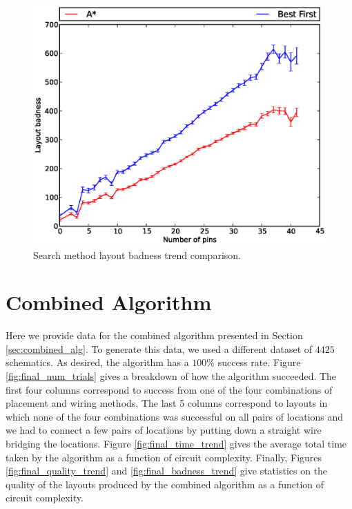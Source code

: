 \begin{figure}[H]
\begin{center}
\includegraphics[width=\textwidth]{Images/search_badness_trend_comparison.eps}
\caption[Search method layout badness trend comparison]{Search method layout
badness trend comparison.}
\label{fig:search_badness_trend}
\end{center}
\end{figure}

\section{Combined Algorithm}
\label{sec:combined_algorithm}

Here we provide data for the combined algorithm presented in Section
\ref{sec:combined_alg}. To generate this data, we used a different dataset of
$4425$ schematics. As desired, the algorithm has a $100\%$ success rate.
Figure \ref{fig:final_num_trials} gives a breakdown of how the algorithm
succeeded. The first four columns correspond to success from one of the four
combinations of placement and wiring methods. The last 5 columns correspond to
layouts in which none of the four combinations was successful on all pairs of
locations and we had to connect a few pairs of locations by putting down a
straight wire bridging the locations. Figure
\ref{fig:final_time_trend} gives the average total time taken by the algorithm
as a function of circuit complexity. Finally, Figures
\ref{fig:final_quality_trend} and \ref{fig:final_badness_trend}
give statistics on the quality of the layouts produced by the combined algorithm
as a function of circuit complexity.

